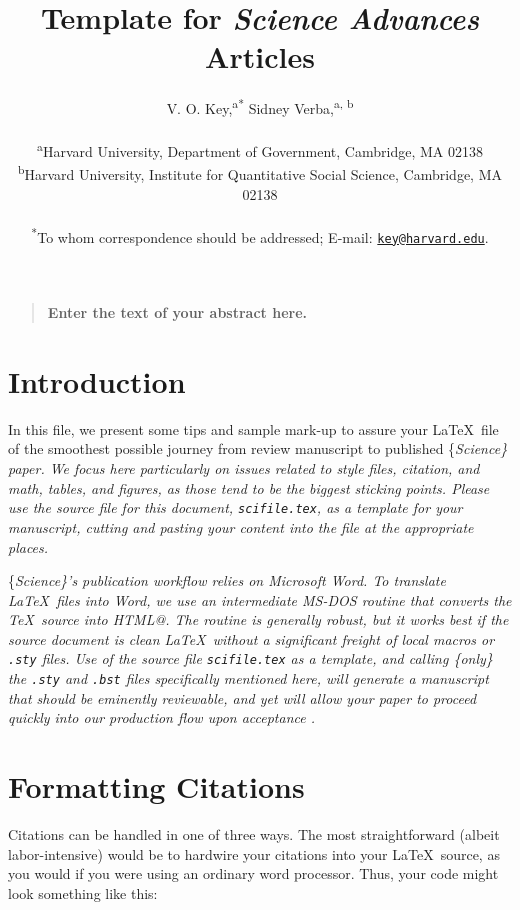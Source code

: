\documentclass[12pt]{article}
\title{Template for \emph{Science Advances} Articles}
\author{
V. O. Key,\textsuperscript{a}\textsuperscript{*}
Sidney Verba,\textsuperscript{a, b}
\\
\\
\normalsize{\textsuperscript{a}Harvard University, Department of
Government, Cambridge, MA 02138}\\
\normalsize{\textsuperscript{b}Harvard University, Institute for
Quantitative Social Science, Cambridge, MA 02138}\\
\\
\textsuperscript{*}To whom correspondence should be addressed; E-mail:
\href{mailto:key@harvard.edu}{\nolinkurl{key@harvard.edu}}.
}
\date{}
\newenvironment{sciabstract}{%
\begin{quote} \bf}
{\end{quote}}
\begin{document}

\baselineskip24pt


\maketitle




\begin{sciabstract}
Enter the text of your abstract here.
\end{sciabstract}

\hypertarget{introduction}{%
\section{Introduction}\label{introduction}}

In this file, we present some tips and sample mark-up to assure your
\LaTeX~file of the smoothest possible journey from review manuscript to
published \{\it Science\/\} paper. We focus here particularly on issues
related to style files, citation, and math, tables, and figures, as
those tend to be the biggest sticking points. Please use the source file
for this document, \texttt{scifile.tex}, as a template for your
manuscript, cutting and pasting your content into the file at the
appropriate places.

\{\it Science\/\}'s publication workflow relies on Microsoft Word. To
translate \LaTeX~files into Word, we use an intermediate MS-DOS routine
\cite{tth} that converts the \TeX~source into HTML@. The routine is
generally robust, but it works best if the source document is clean
\LaTeX~without a significant freight of local macros or \texttt{.sty}
files. Use of the source file \texttt{scifile.tex} as a template, and
calling \{\it only\/\} the \texttt{.sty} and \texttt{.bst} files
specifically mentioned here, will generate a manuscript that should be
eminently reviewable, and yet will allow your paper to proceed quickly
into our production flow upon acceptance \cite{use2e}.

\hypertarget{formatting-citations}{%
\section{Formatting Citations}\label{formatting-citations}}

Citations can be handled in one of three ways. The most straightforward
(albeit labor-intensive) would be to hardwire your citations into your
\LaTeX~source, as you would if you were using an ordinary word
processor. Thus, your code might look something like this:
\end{document}
